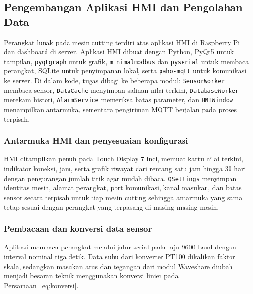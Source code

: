 \begingroup
\setlength{\BatasTinggiGambar}{3.3cm}
\endgroup

\setlength{\TinggiRuangGambar}{3.2cm}
\setlength{\BatasTinggiGambar}{0.58\textheight}
\captionsetup[figure]{skip=12pt}

\subsection{Pengembangan Aplikasi HMI dan Pengolahan Data}

Perangkat lunak pada mesin cutting terdiri atas aplikasi HMI di Raspberry Pi dan dashboard di server. Aplikasi HMI dibuat dengan Python, PyQt5 untuk tampilan, \texttt{pyqtgraph} untuk grafik, \texttt{minimalmodbus} dan \texttt{pyserial} untuk membaca perangkat, SQLite untuk penyimpanan lokal, serta \texttt{paho-mqtt} untuk komunikasi ke server. Di dalam kode, tugas dibagi ke beberapa modul: \texttt{SensorWorker} membaca sensor, \texttt{DataCache} menyimpan salinan nilai terkini, \texttt{DatabaseWorker} merekam histori, \texttt{AlarmService} memeriksa batas parameter, dan \texttt{HMIWindow} menampilkan antarmuka, sementara pengiriman MQTT berjalan pada proses terpisah.

\subsubsection{Antarmuka HMI dan penyesuaian konfigurasi}

HMI ditampilkan penuh pada Touch Display 7 inci, memuat kartu nilai terkini, indikator koneksi, jam, serta grafik riwayat dari rentang satu jam hingga 30 hari dengan pengurangan jumlah titik agar mudah dibaca. \texttt{QSettings} menyimpan identitas mesin, alamat perangkat, port komunikasi, kanal masukan, dan batas sensor secara terpisah untuk tiap mesin cutting sehingga antarmuka yang sama tetap sesuai dengan perangkat yang terpasang di masing-masing mesin.

\subsubsection{Pembacaan dan konversi data sensor}

Aplikasi membaca perangkat melalui jalur serial pada laju 9600 baud dengan interval nominal tiga detik. Data suhu dari konverter PT100 dikalikan faktor skala, sedangkan masukan arus dan tegangan dari modul Waveshare diubah menjadi besaran teknik menggunakan konversi linier pada Persamaan~\ref{eq:konversi}.

